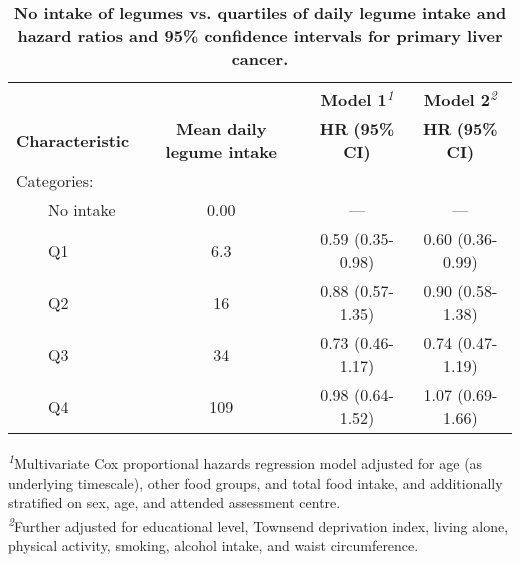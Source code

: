 \documentclass[nutrients,article,submit,moreauthors,pdftex]{Definitions/mdpi}
\begin{document}
\begin{table}[t]
\caption{\label{tab:legume}\textbf{No intake of legumes vs. quartiles of daily legume intake and hazard ratios and 95\% confidence intervals for primary liver cancer.}}
\fontsize{9.0pt}{10.8pt}\selectfont
\begin{tabular*}{1\linewidth}{@{\extracolsep{\fill}}lccc}
\toprule
 &  & \textbf{Model 1}\textsuperscript{\textit{1}} & \textbf{Model 2}\textsuperscript{\textit{2}} \\
\cmidrule(lr){3-3} \cmidrule(lr){4-4}
\textbf{Characteristic} & \textbf{Mean daily legume intake} & \textbf{HR} \textbf{(95\% CI)} & \textbf{HR} \textbf{(95\% CI)} \\
\midrule\addlinespace[2.5pt]
Categories: &  &  &  \\
    No intake & 0.00 & — & — \\
    Q1 & 6.3 & 0.59 (0.35-0.98) & 0.60 (0.36-0.99) \\
    Q2 & 16 & 0.88 (0.57-1.35) & 0.90 (0.58-1.38) \\
    Q3 & 34 & 0.73 (0.46-1.17) & 0.74 (0.47-1.19) \\
    Q4 & 109 & 0.98 (0.64-1.52) & 1.07 (0.69-1.66) \\
\bottomrule
\end{tabular*}
\begin{minipage}{\linewidth}
\textsuperscript{\textit{1}}Multivariate Cox proportional hazards regression model adjusted for age (as underlying timescale), other food groups, and total food intake, and additionally stratified on sex, age, and attended assessment centre.\\
\textsuperscript{\textit{2}}Further adjusted for educational level, Townsend deprivation index, living alone, physical activity, smoking, alcohol intake, and waist circumference.\\
\end{minipage}
\end{table}

\clearpage
\startlandscape
\end{document}
